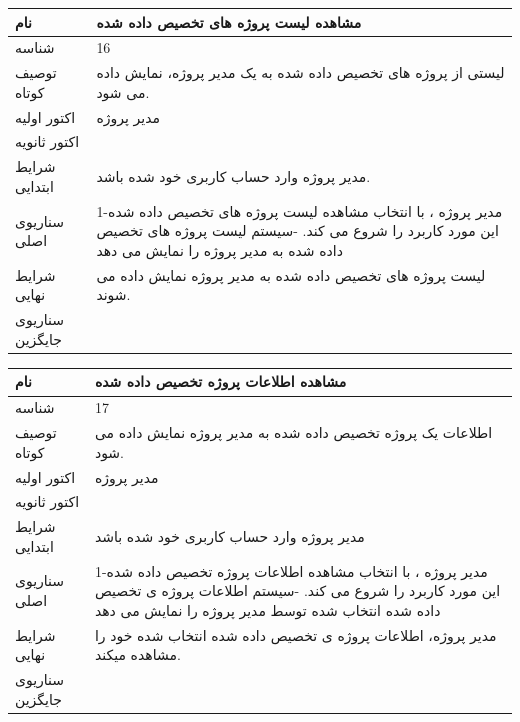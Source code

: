 \documentclass{article}
\begin{document}
\begin{tabular}{|p{2cm}|p{10cm}|}
\hline
نام
&
مشاهده  لیست پروژه های تخصیص داده شده
\\
\hline
شناسه
&
16
\\
\hline
توصیف کوتاه
&
لیستی از پروژه های تخصیص داده شده به یک مدیر پروژه، نمایش داده می شود.
\\
\hline
اکتور اولیه
&
مدیر پروژه
\\
\hline
اکتور ثانویه
&

\\
\hline
شرایط ابتدایی
&
مدیر پروژه وارد حساب کاربری خود شده باشد. 
\\
\hline
سناریوی اصلی
&
1-مدیر پروژه ، با انتخاب مشاهده  لیست پروژه های تخصیص داده شده  این مورد کاربرد را شروع می کند.
\newline
2-سیستم لیست پروژه های تخصیص داده شده به مدیر پروژه را نمایش می دهد
\\
\hline
شرایط نهایی
&
لیست پروژه های تخصیص داده شده به مدیر پروژه نمایش داده می شوند.
\\
\hline
سناریوی جایگزین
&

\\
\hline
\end{tabular}

\vspace{2cm}

\begin{tabular}{|p{2cm}|p{10cm}|}
\hline
نام
&
مشاهده اطلاعات پروژه تخصیص داده شده
\\
\hline
شناسه
&
17
\\
\hline
توصیف کوتاه
&
اطلاعات یک پروژه  تخصیص داده شده به مدیر پروژه نمایش داده می شود.
\\
\hline
اکتور اولیه
&
مدیر پروژه
\\
\hline
اکتور ثانویه
&

\\
\hline
شرایط ابتدایی
&
مدیر پروژه وارد حساب کاربری خود شده باشد
\\
\hline
سناریوی اصلی
&
1-مدیر پروژه ، با انتخاب مشاهده اطلاعات پروژه  تخصیص داده شده این مورد کاربرد را شروع می کند.
\newline
2-سیستم اطلاعات پروژه ی تخصیص داده شده انتخاب شده  توسط مدیر پروژه را نمایش می دهد

\\
\hline
شرایط نهایی
&
مدیر پروژه، اطلاعات پروژه ی تخصیص داده شده انتخاب شده  خود را مشاهده میکند.
\\
\hline
سناریوی جایگزین
&

\\
\hline
\end{tabular}
\end{document}
